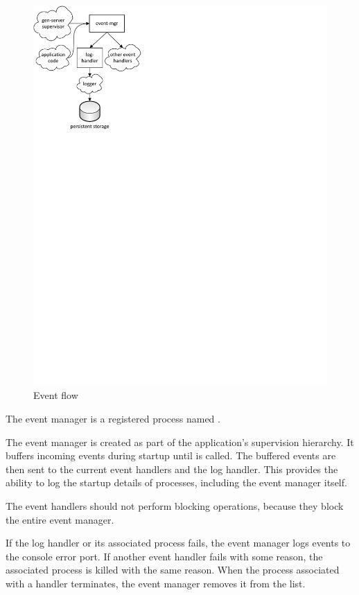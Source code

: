\begin{figure}
  \begin{center}
    \includegraphics[trim=0 531 387 0]{swish/event-mgr-events.pdf}
  \end{center}
  \caption{\label{fig:event-mgr-flow}Event flow}
\end{figure}

The event manager is a registered process named .

The event manager is created as part of the application's supervision
hierarchy. It buffers incoming events during startup until
 is called. The buffered events are
then sent to the current event handlers and the log handler. This
provides the ability to log the startup details of processes,
including the event manager itself.

The event handlers should not perform blocking operations, because
they block the entire event manager.

If the log handler or its associated process fails, the event manager
logs events to the console error port. If another event handler fails
with some reason, the associated process is killed with the same
reason. When the process associated with a handler terminates, the
event manager removes it from the list.

